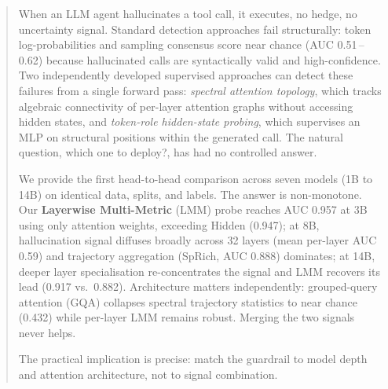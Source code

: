 \documentclass{article}
\begin{document}

\printAffiliationsAndNotice{}

\begin{abstract}
When an LLM agent hallucinates a tool call, it executes, no hedge,
no uncertainty signal.  Standard detection approaches fail structurally:
token log-probabilities and sampling consensus score near chance
(AUC 0.51\,--\,0.62) because hallucinated calls are syntactically valid
and high-confidence.  Two independently developed supervised approaches
can detect these failures from a single forward pass: \emph{spectral
attention topology}, which tracks algebraic connectivity of per-layer
attention graphs without accessing hidden states, and \emph{token-role
hidden-state probing}, which supervises an MLP on structural positions
within the generated call.  The natural question, which one to
deploy?, has had no controlled answer.

We provide the first head-to-head comparison across seven models
(1B to 14B) on identical data, splits, and labels.  The answer is
non-monotone.  Our \textbf{Layerwise Multi-Metric} (LMM) probe reaches
AUC 0.957 at 3B using only attention weights, exceeding Hidden (0.947);
at 8B, hallucination signal diffuses broadly across 32 layers (mean
per-layer AUC 0.59) and trajectory aggregation (SpRich, AUC 0.888)
dominates; at 14B, deeper layer specialisation re-concentrates the
signal and LMM recovers its lead (0.917 vs.\ 0.882).  Architecture
matters independently: grouped-query attention (GQA) collapses spectral
trajectory statistics to near chance (0.432) while per-layer LMM
remains robust.  Merging the two signals never helps.

The practical implication is precise: match the guardrail to model
depth and attention architecture, not to signal combination.
\end{abstract}
\end{document}
